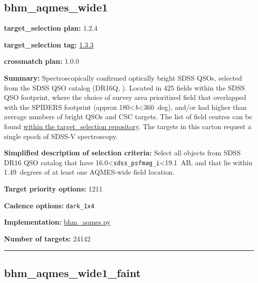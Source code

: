 \hypertarget{bhm_aqmes_wide1_plan1.2.4}{%
\subsection{bhm\_aqmes\_wide1}\label{bhm_aqmes_wide1_plan1.2.4}}

\noindent\textbf{target\_selection plan:} 1.2.4

\noindent\textbf{target\_selection tag:}
\href{https://github.com/sdss/target_selection/tree/1.3.3/}{1.3.3}

\noindent\textbf{crossmatch plan:} 1.0.0

\noindent\textbf{Summary:} Spectroscopically confirmed optically bright SDSS
QSOs, selected from the SDSS QSO catalog (DR16Q,
\citealt{Lyke2020}). Located in 425 fields within the SDSS QSO footprint,
where the choice of survey area prioritized field that overlapped with
the SPIDERS footprint (approx 180\textless{}\emph{b}\textless360~deg),
and/or had higher than average numbers of bright QSOs and CSC targets.
The list of field centres can be found
\href{https://github.com/sdss/target_selection/blob/0.3.0/python/target_selection/masks/candidate_target_fields_bhm_aqmes_wide_v0.3.1.fits}{within
the target\_selection repository}. The targets in this carton request a
single epoch of SDSS-V spectroscopy.

\noindent\textbf{Simplified description of selection criteria:} Select all
objects from SDSS DR16 QSO catalog that have
16.0\textless{}\texttt{sdss\_psfmag\_i}\textless19.1~AB, and that lie
within 1.49~degrees of at least one AQMES-wide field location.


\noindent\textbf{Target priority options:} 1211

\noindent\textbf{Cadence options:} \texttt{dark\_1x4}

\noindent\textbf{Implementation:}
\href{https://github.com/sdss/target_selection/blob/1.3.3/python/target_selection/cartons/bhm_aqmes.py}{bhm\_aqmes.py}

\noindent\textbf{Number of targets:} 24142

\begin{center}\rule{0.5\linewidth}{0.5pt}\end{center}

\hypertarget{bhm_aqmes_wide1_faint_plan1.2.4}{%
\subsection{bhm\_aqmes\_wide1\_faint}\label{bhm_aqmes_wide1_faint_plan1.2.4}}

